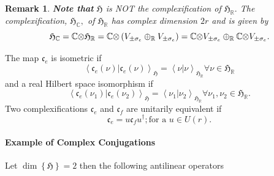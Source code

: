 \documentclass[aps,preprint]{revtex4}
\newtheorem{remark}[theorem]{Remark}
\begin{document}
\begin{remark}
\textbf{Note that} $\mathfrak{H}$ is \emph{NOT} the complexification of $%
\mathfrak{H}_{\mathbb{R}}.$ The complexification, $\mathfrak{H}_{\mathbb{C}%
}, $ of $\mathfrak{H}_{\mathbb{R}}$ has \emph{complex dimension} $2r$ and is
given by 
\begin{equation}
\mathfrak{H}_{\mathbb{C}}=\mathbb{C\otimes}\mathfrak{H}_{\mathbb{R}}=\mathbb{%
C\otimes}\left( V_{\pm\sigma_{e}}\oplus_{\mathbb{R}}V_{\pm
\sigma_{e}}\right) =\mathbb{C\otimes}V_{\pm\sigma_{e}}\oplus_{\mathbb{R}}%
\mathbb{C\otimes}V_{\pm\sigma_{e}}.
\end{equation}
\end{remark}

The map $\mathfrak{c}_{e}$ is isometric if 
\begin{equation}
\left\langle \left. \mathfrak{c}_{e}\left( \nu\right) \right\vert \mathfrak{c%
}_{e}\left( \nu\right) \right\rangle _{\mathfrak{H}}=\left\langle \left.
\nu\right\vert \nu\right\rangle _{\mathfrak{H}_{\mathbb{R}}}\forall \nu\in%
\mathfrak{H}_{\mathbb{R}}
\end{equation}
and a real Hilbert space isomorphism if 
\begin{equation}
\left\langle \left. \mathfrak{c}_{e}\left( \nu_{1}\right) \right\vert 
\mathfrak{c}_{e}\left( \nu_{2}\right) \right\rangle _{\mathfrak{H}%
}=\left\langle \left. \nu_{1}\right\vert \nu_{2}\right\rangle _{\mathfrak{H}%
_{\mathbb{R}}}\forall\nu_{1},\nu_{2}\in\mathfrak{H}_{\mathbb{R}}.
\end{equation}
Two complexifications $\mathfrak{c}_{e}$ and $\mathfrak{c}_{f}$ are
unitarily equivalent if 
\begin{equation}
\mathfrak{c}_{e}=u\mathfrak{c}_{f}u^{\dagger};\text{for a }u\in U\left(
r\right) .
\end{equation}

\paragraph{Example of Complex Conjugations}

Let $\dim\left\{ \mathfrak{H}\right\} =2$ then the following antilinear
operators
\end{document}
